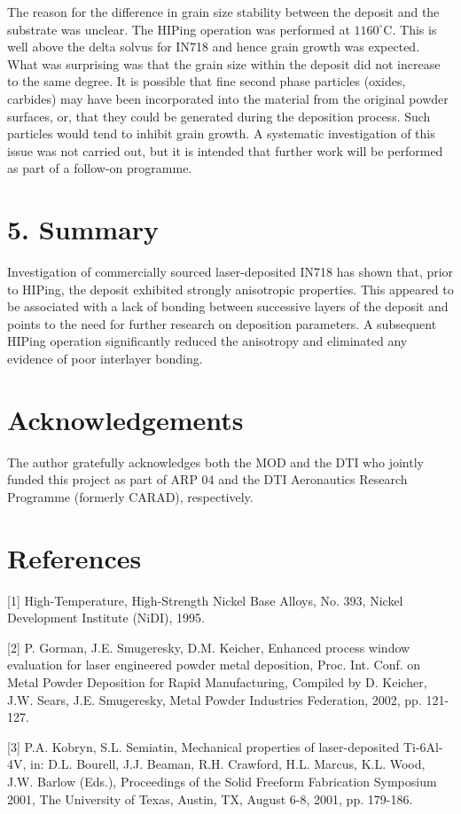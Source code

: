 \documentclass[10pt]{article}
\begin{document}
The reason for the difference in grain size stability between the deposit and the substrate was unclear. The HIPing operation was performed at $1160^{\circ} \mathrm{C}$. This is well above the delta solvus for IN718 and hence grain growth was expected. What was surprising was that the grain size within the deposit did not increase to the same degree. It is possible that fine second phase particles (oxides, carbides) may have been incorporated into the material from the original powder surfaces, or, that they could be generated during the deposition process. Such particles would tend to inhibit grain growth. A systematic investigation of this issue was not carried out, but it is intended that further work will be performed as part of a follow-on programme.

\section*{5. Summary}
Investigation of commercially sourced laser-deposited IN718 has shown that, prior to HIPing, the deposit exhibited strongly anisotropic properties. This appeared to be associated with a lack of bonding between successive layers of the deposit and points to the need for further research on deposition parameters. A subsequent HIPing operation significantly reduced the anisotropy and eliminated any evidence of poor interlayer bonding.

\section*{Acknowledgements}
The author gratefully acknowledges both the MOD and the DTI who jointly funded this project as part of ARP 04 and the DTI Aeronautics Research Programme (formerly CARAD), respectively.

\section*{References}
[1] High-Temperature, High-Strength Nickel Base Alloys, No. 393, Nickel Development Institute (NiDI), 1995.

[2] P. Gorman, J.E. Smugeresky, D.M. Keicher, Enhanced process window evaluation for laser engineered powder metal deposition, Proc. Int. Conf. on Metal Powder Deposition for Rapid Manufacturing, Compiled by D. Keicher, J.W. Sears, J.E. Smugeresky, Metal Powder Industries Federation, 2002, pp. 121-127.

[3] P.A. Kobryn, S.L. Semiatin, Mechanical properties of laser-deposited Ti-6Al-4V, in: D.L. Bourell, J.J. Beaman, R.H. Crawford, H.L. Marcus, K.L. Wood, J.W. Barlow (Eds.), Proceedings of the Solid Freeform Fabrication Symposium 2001, The University of Texas, Austin, TX, August 6-8, 2001, pp. 179-186.
\end{document}
